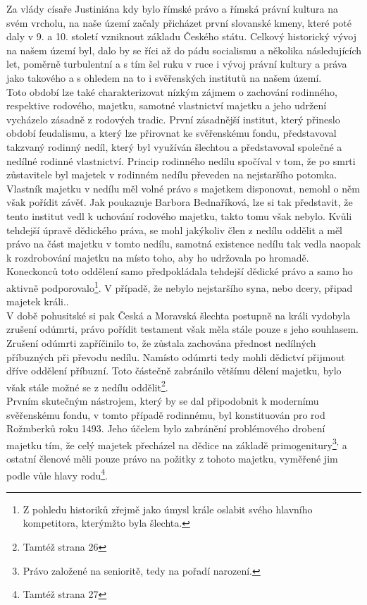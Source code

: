 \documentclass{article}
\begin{document}
Za vlády císaře Justiniána kdy bylo římské právo a římská právní kultura na svém vrcholu, na naše území začaly přicházet první slovanské kmeny, které poté daly v 9. a 10. století vzniknout základu Českého státu. Celkový historický vývoj na našem území byl, dalo by se říci až do pádu socialismu a několika následujících let, poměrně turbulentní a s tím šel ruku v ruce i vývoj právní kultury a práva jako takového a s ohledem na to i svěřenských institutů na našem území. \\

Toto období lze také charakterizovat nízkým zájmem o zachování rodinného, respektive rodového, majetku, samotné vlastnictví majetku a jeho udržení vycházelo zásadně z rodových tradic. První zásadnější institut, který přineslo období feudalismu, a který lze přirovnat ke svěřenskému fondu, představoval takzvaný rodinný nedíl, který byl využíván šlechtou a představoval společné a nedílné rodinné vlastnictví. Princip rodinného nedílu spočíval v tom, že po smrti zůstavitele byl majetek v rodinném nedílu převeden na nejstaršího potomka. Vlastník majetku v nedílu měl volné právo s majetkem disponovat, nemohl o něm však pořídit závěť. Jak poukazuje Barbora Bednaříková, lze si tak představit, že tento institut vedl k uchování rodového majetku, takto tomu však nebylo. Kvůli tehdejší úpravě dědického práva, se mohl jakýkoliv člen z nedílu oddělit a měl právo na část majetku v tomto nedílu, samotná existence nedílu tak vedla naopak k rozdrobování majetku na místo toho, aby ho udržovala po hromadě. Koneckonců toto oddělení samo předpokládala tehdejší dědické právo a samo ho aktivně podporovalo\footnote{Z pohledu historiků zřejmě jako úmysl krále oslabit svého hlavního kompetitora, kterýmžto byla šlechta.}. V případě, že nebylo nejstaršího syna, nebo dcery, připad majetek králi..\\

V době pohusitské si pak Česká a Moravská šlechta postupně na králi vydobyla zrušení odúmrti, právo pořídit testament však měla stále pouze s jeho souhlasem. Zrušení odúmrti zapříčinilo to, že zůstala zachována přednost nedílných příbuzných při převodu nedílu. Namísto odúmrti tedy mohli dědictví přijmout dříve oddělení příbuzní. Toto částečně zabránilo většímu dělení majetku, bylo však stále možné se z nedílu oddělit\footnote{Tamtéž strana 26}.\\

Prvním skutečným nástrojem, který by se dal připodobnit k modernímu svěřenskému fondu, v tomto případě rodinnému, byl konstituován pro rod Rožmberků roku 1493. Jeho účelem bylo zabránění problémového drobení majetku tím, že celý majetek přecházel na dědice na základě primogenitury\footnote{Právo založené na senioritě, tedy na pořadí narození.}\textsuperscript{,} a ostatní členové měli pouze právo na požitky z tohoto majetku, vyměřené jim podle vůle hlavy rodu\footnote{Tamtéž strana 27}.\\
\end{document}
